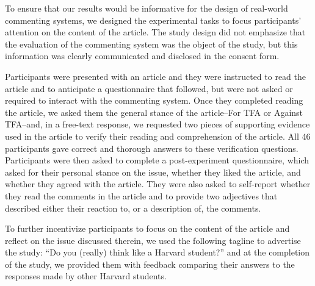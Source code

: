 
To ensure that our results would be informative for the design of real-world commenting systems, we designed the experimental tasks to focus participants' attention on the content of the article.  The study design did not emphasize that the evaluation of the commenting system was the object of the study, but this information was clearly communicated and disclosed in the consent form. 

Participants were presented with an article and they were instructed to read the article and to anticipate a questionnaire that followed, but were not asked or required to interact with the commenting system.  Once they completed reading the article, we asked them the general stance of the article--For TFA or Against TFA--and, in a free-text response, we requested two pieces of supporting evidence used in the article to verify their reading and comprehension of the article. All 46 participants gave correct and thorough answers to these verification questions. Participants were then asked to complete a post-experiment questionnaire, which asked for their personal stance on the issue, whether they liked the article, and whether they agreed with the article. They were also asked to self-report whether they read the comments in the article and to provide two adjectives that described either their reaction to, or a description of, the comments.



To further incentivize participants to focus on the content of the article and reflect on the issue discussed therein, we used the following tagline to advertise the study: ``Do you (really) think like a Harvard student?'' and at the completion of the study, we provided them with feedback comparing their answers to the responses made by other Harvard students.

%

